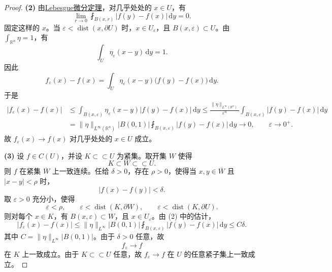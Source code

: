 \documentclass[../main.tex]{subfiles}
\begin{document}
\begin{proof}
\textbf{(2)}
由\hyperref[Real Analysis-corollary:可积函数的Lebesgue点]{Lebesgue微分定理}，对几乎处处的 \(x\in U\)，有
\[
\lim_{r\to0}\fint_{B(x,r)}|f(y)-f(x)|\,\mathrm dy=0.
\]
固定这样的 \(x\)。当 \(\varepsilon<\operatorname{dist}(x,\partial U)\) 时，\(x\in U_\varepsilon\)，且 \(B(x,\varepsilon)\subset U\)。由 \(\int_{\mathbb R^n}\eta=1\)，有
\[
\int_U \eta_\varepsilon(x-y)\,\mathrm dy=1.
\]
因此
\[
f_\varepsilon(x)-f(x)
=\int_U \eta_\varepsilon(x-y)\bigl(f(y)-f(x)\bigr)\,\mathrm dy.
\]
于是
\[
\begin{aligned}
|f_\varepsilon(x)-f(x)|
&\leqslant \int_{B(x,\varepsilon)}\eta_\varepsilon(x-y)|f(y)-f(x)|\,\mathrm dy\leqslant \frac{\|\eta\|_{L^{\infty}\left( \mathbb{R} ^n \right) }}{\varepsilon^n}
\int_{B(x,\varepsilon)}|f(y)-f(x)|\,\mathrm dy\\
&=\|\eta\|_{L^{\infty}\left( \mathbb{R} ^n \right) }|B(0,1)|
\fint_{B(x,\varepsilon)}|f(y)-f(x)|\,\mathrm dy\to0,
\qquad \varepsilon\to0^+.
\end{aligned}
\]
故 \(f_\varepsilon(x)\to f(x)\) 对几乎处处的 \(x\in U\) 成立。

\textbf{(3)}
设 \(f\in C(U)\)，并设 \(K\subset\subset U\) 为紧集。取开集 \(W\) 使得
\[
K\subset W\subset\subset U.
\]
则 \(f\) 在紧集 \(\overline W\) 上一致连续。任给 \(\delta>0\)，存在 \(\rho>0\)，使得当 \(x,y\in\overline W\) 且 \(|x-y|<\rho\) 时，
\[
|f(x)-f(y)|<\delta.
\]
取 \(\varepsilon>0\) 充分小，使得
\[
\varepsilon<\rho,\qquad \varepsilon<\operatorname{dist}(K,\partial W),\qquad \varepsilon<\operatorname{dist}(K,\partial U).
\]
则对每个 \(x\in K\)，有 \(B(x,\varepsilon)\subset W\)，且 \(x\in U_\varepsilon\)。由 (2) 中的估计，
\[
|f_\varepsilon(x)-f(x)|
\leqslant \|\eta\|_{L^\infty}|B(0,1)|
\fint_{B(x,\varepsilon)}|f(y)-f(x)|\,\mathrm dy
\leqslant C\delta.
\]
其中 \(C=\|\eta\|_{L^\infty}|B(0,1)|\)。由于 \(\delta>0\) 任意，故
\[
f_\varepsilon\to f
\]
在 \(K\) 上一致成立。由于 \(K\subset\subset U\) 任意，故 \(f_\varepsilon\to f\) 在 \(U\) 的任意紧子集上一致成立。


\end{proof}
\end{document}
